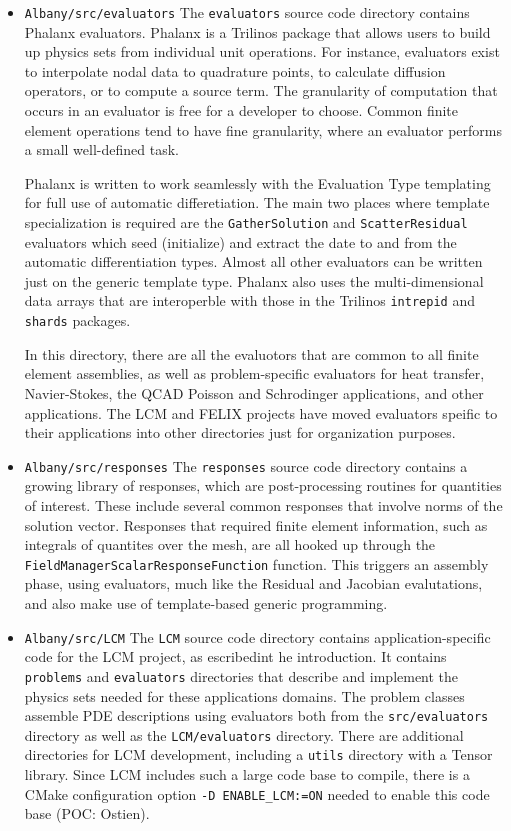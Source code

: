 \documentclass[pdf,12pt,report,strict]{SANDreport}
\theoremstyle{remark}
\begin{document}
\begin{itemize}
\item{\texttt{Albany/src/evaluators}}  The \texttt{evaluators} source code directory contains
Phalanx evaluators. Phalanx is a Trilinos package that allows users to build up physics
sets from individual unit operations. For instance, evaluators exist to interpolate
nodal data to quadrature points, to calculate diffusion operators, or to compute a
source term. The granularity of computation that occurs in an evaluator is 
free for a developer to choose. Common finite element operations tend to have fine
granularity, where an evaluator performs a small well-defined task.

Phalanx is written to work seamlessly with the Evaluation Type templating for full
use of automatic differetiation. The main two places where template specialization is
required are the \texttt{GatherSolution} and \texttt{ScatterResidual} evaluators which
seed (initialize) and extract the date to and from the automatic differentiation types.
Almost all other evaluators can be written just on the generic template type.
Phalanx also uses the multi-dimensional data arrays that are interoperble with those in the
Trilinos \texttt{intrepid} and \texttt{shards} packages.

In this directory, there are all the evaluotors that are common to all finite element
assemblies, as well as problem-specific evaluators for heat transfer, Navier-Stokes, 
the QCAD Poisson and Schrodinger applications, and other applications. The LCM and
FELIX projects have moved evaluators speific to their applications into other directories
just for organization purposes.

\item{\texttt{Albany/src/responses}}  The \texttt{responses} source code directory contains
a growing library of responses, which are post-processing routines for quantities of interest.
These include several common responses that involve norms of the solution vector. 
Responses that required finite element information, such as integrals of quantites
over the mesh, are all hooked up through the
\texttt{FieldManagerScalarResponseFunction} function. This triggers an assembly
phase, using evaluators, much like the Residual and Jacobian evalutations, and 
also make use of template-based generic programming.

\item{\texttt{Albany/src/LCM}}  The \texttt{LCM} source code directory contains 
application-specific code for the LCM project, as escribedint he introduction. It contains
\texttt{problems} and \texttt{evaluators} directories that describe and implement
the physics sets needed for these applications domains. The problem classes assemble
PDE descriptions using evaluators both from the \texttt{src/evaluators} directory as
well as the \texttt{LCM/evaluators} directory. There are additional
directories for LCM development, including a \texttt{utils} directory with a Tensor
library. Since LCM includes such a large code base to compile, there is a CMake configuration 
option \texttt{-D ENABLE\_LCM:=ON} needed to enable this code base (POC: Ostien).


\end{itemize}
\end{document}

